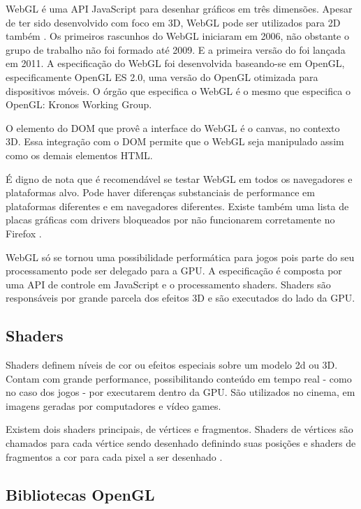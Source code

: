 WebGL é uma API JavaScript para desenhar gráficos em três dimensões.
Apesar de ter sido desenvolvido com foco em 3D, WebGL pode ser
utilizados para 2D também \autocite[pp. 6]{3daps}. Os primeiros
rascunhos do WebGL iniciaram em 2006, não obstante o grupo de trabalho
não foi formado até 2009. E a primeira versão do foi lançada em
2011.
A especificação do WebGL foi desenvolvida baseando-se em OpenGL,
especificamente OpenGL ES 2.0, uma versão do OpenGL otimizada para
dispositivos móveis. O órgão que especifica o WebGL é o mesmo que
especifica o OpenGL: Kronos Working Group.

O elemento do DOM que provê a interface do WebGL é o canvas, no contexto 3D.
Essa integração com o DOM permite que o WebGL seja manipulado assim como os demais elementos HTML.

É digno de nota que é recomendável se testar WebGL em todos os navegadores
e plataformas alvo. Pode haver diferenças substanciais de performance em
plataformas diferentes e em navegadores diferentes. Existe também uma lista
de placas gráficas com drivers bloqueados por não funcionarem corretamente no
Firefox \autocite[pp.42]{3daps}.

WebGL só se tornou uma possibilidade performática para jogos
pois parte do seu processamento pode ser delegado para a GPU. A
especificação é composta por uma API de controle em JavaScript e o
processamento shaders. Shaders são responsáveis por grande parcela dos
efeitos 3D e são executados do lado da GPU.

\subsection{Shaders}

Shaders definem níveis de cor ou efeitos especiais sobre um modelo 2d
ou 3D. Contam com grande performance, possibilitando conteúdo em tempo
real - como no caso dos jogos - por executarem dentro da GPU.
São utilizados no cinema, em imagens geradas por computadores e vídeo games.

Existem dois shaders principais, de vértices e fragmentos.
Shaders de vértices são chamados para cada vértice sendo desenhado
definindo suas posições e shaders de fragmentos a cor para cada pixel
a ser desenhado \autocite[pp.15]{3daps}.

\subsection{Bibliotecas OpenGL}

